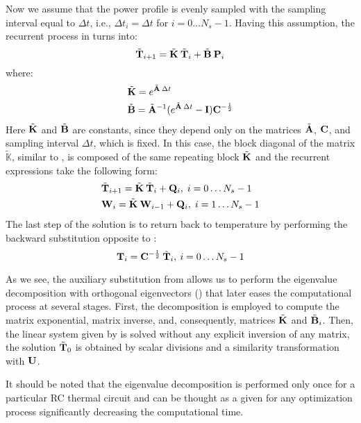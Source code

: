 Now we assume that the power profile is evenly sampled with the sampling interval equal to $\Delta t$, i.e., $\Delta t_i = \Delta t$ for $i = 0 \dots N_s - 1$. Having this assumption, the recurrent process in  turns into:
\[
  \tilde{\mathbf{T}}_{i+1} = \tilde{\mathbf{K}} \: \tilde{\mathbf{T}}_i + \tilde{\mathbf{B}} \: \mathbf{P}_i
\]
where:
\begin{align*}
  & \tilde{\mathbf{K}} = e^{\tilde{\mathbf{A}} \: \Delta t} \\
  & \tilde{\mathbf{B}} = \tilde{\mathbf{A}}^{-1} ( e^{\tilde{\mathbf{A}} \: \Delta t} - \mathbf{I} ) \mathbf{C}^{-\frac{1}{2}}
\end{align*}
Here $\tilde{\mathbf{K}}$ and $\tilde{\mathbf{B}}$ are constants, since they depend only on the matrices $\tilde{\mathbf{A}}$, $\mathbf{C}$, and sampling interval $\Delta t$, which is fixed. In this case, the block diagonal of the matrix $\tilde{\mathbb{K}}$, similar to , is composed of the same repeating block $\tilde{\mathbf{K}}$ and the recurrent expressions take the following form:
\begin{align}
  & \tilde{\mathbf{T}}_{i + 1} = \tilde{\mathbf{K}} \: \tilde{\mathbf{T}}_i + \mathbf{Q}_i, \; i = 0 \dots N_s - 1 \nonumber \\
  & \mathbf{W}_i = \tilde{\mathbf{K}} \: \mathbf{W}_{i - 1} + \mathbf{Q}_i, \; i = 1 \dots N_s - 1 \nonumber
\end{align}
The last step of the solution is to return back to temperature by performing the backward substitution opposite to :
\[
  \mathbf{T}_i = \mathbf{C}^{-\frac{1}{2}} \: \tilde{\mathbf{T}}_i, \: i = 0 \dots N_s - 1
\]

As we see, the auxiliary substitution from  allows us to perform the eigenvalue decomposition with orthogonal eigenvectors () that later eases the computational process at several stages. First, the decomposition is employed to compute the matrix exponential, matrix inverse, and, consequently, matrices $\tilde{\mathbf{K}}$ and $\tilde{\mathbf{B}}_i$. Then, the linear system given by  is solved without any explicit inversion of any matrix, the solution $\tilde{\mathbf{T}}_0$ is obtained by scalar divisions and a similarity transformation with $\mathbf{U}$.

It should be noted that the eigenvalue decomposition is performed only once for a particular RC thermal circuit and can be thought as a given for any optimization process significantly decreasing the computational time.
